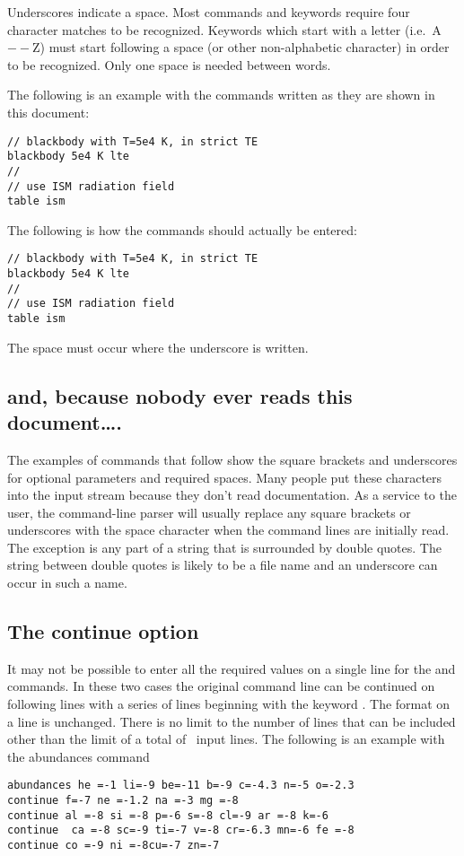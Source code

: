 Underscores indicate a space.  Most commands and keywords require four
character matches to be recognized.  Keywords which start with a letter (i.e.\ A$--$Z) must start following a space (or other non-alphabetic character) in order to be recognized.
Only one space is needed between words.

The following is an example with the commands written as they are shown
in this document:
\begin{verbatim}
// blackbody with T=5e4 K, in strict TE
blackbody 5e4 K lte
//
// use ISM radiation field
table ism
\end{verbatim}
The following is how the commands should actually be entered:
\begin{verbatim}
// blackbody with T=5e4 K, in strict TE
blackbody 5e4 K lte
//
// use ISM radiation field
table ism
\end{verbatim}
The space must occur where the underscore is written.

\subsection{and, because nobody ever reads this document\dots.}

The examples of commands that follow show the square brackets
and underscores for
optional parameters and required spaces.
Many people put these characters
into the input stream because they don't read documentation.
As a service to the user, the command-line parser will
usually replace any square brackets
or underscores with the space character when the command lines
are initially read.
The exception is any part of a string that is surrounded by double
quotes.
The string between double quotes is likely to be a file name and
an underscore can occur in such a name.

\subsection{The continue option}

It may not be possible to enter all the required values on a single line
for the  and  commands.  In these two cases the original
command line can be continued on following lines with a series of lines
beginning with the keyword .  The format on a  line is
unchanged.  There is no limit to the number of  lines that can be
included other than the limit of a total of \NKRD\ input lines.   The following
is an example with the abundances command
\begin{verbatim}
abundances he =-1 li=-9 be=-11 b=-9 c=-4.3 n=-5 o=-2.3
continue f=-7 ne =-1.2 na =-3 mg =-8
continue al =-8 si =-8 p=-6 s=-8 cl=-9 ar =-8 k=-6
continue  ca =-8 sc=-9 ti=-7 v=-8 cr=-6.3 mn=-6 fe =-8
continue co =-9 ni =-8cu=-7 zn=-7
\end{verbatim}

